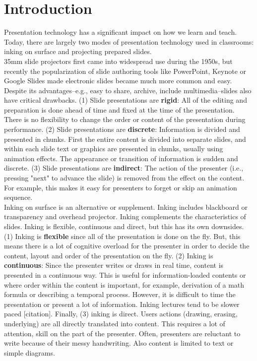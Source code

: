 \section{Introduction}

Presentation technology has a significant impact on how we learn and teach. Today, there are largely two modes of presentation technology used in classrooms: inking on surface and projecting prepared slides. \\
35mm slide projectors first came into widespread use during the 1950s, but recently the popularization of slide authoring tools like PowerPoint, Keynote or Google Slides made electronic slides became much more common and easy. Despite its advantages--e.g., easy to share, archive, include multimedia--slides also have critical drawbacks. 
(1) Slide presentations are \textbf{rigid}: All of the editing and preparation is done ahead of time and fixed at the time of the presentation. There is no flexibility to change the order or content of the presentation during performance. 
(2) Slide presentations are \textbf{discrete}: Information is divided and presented in chunks. First the entire content is divided into separate slides, and within each slide text or graphics are presented in chunks, usually using animation effects. The appearance or transition of information is sudden and discrete.
(3) Slide presentations are \textbf{indirect}: The action of the presenter (i.e., pressing "next" to advance the slide) is removed from the effect on the content. For example, this makes it easy for presenters to forget or skip an animation sequence.\\

Inking on surface is an alternative or supplement. Inking includes blackboard or transparency and overhead projector. Inking complements the characteristics of slides. Inking is flexible, continuous and direct, but this has its own downsides.
(1) Inking is \textbf{flexible} since all of the presentation is done on the fly. But, this means there is a lot of cognitive overload for the presenter in order to decide the content, layout and order of the presentation on the fly. 
(2) Inking is \textbf{continuous}: Since the presenter writes or draws in real time, content is presented in a continuous way. This is useful for information-loaded contents or where order within the content is important, for example, derivation of a math formula or describing a temporal process. However, it is difficult to time the presentation or present a lot of information. Inking lectures tend to be slower paced [citation].
Finally, (3) inking is direct. Users actions (drawing, erasing, underlying) are all directly translated into content. This requires a lot of attention, skill on the part of the presenter. Often, presenters are reluctant to write because of their messy handwriting. Also content is limited to text or simple diagrams.

